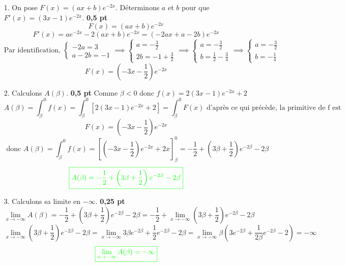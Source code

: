 \documentclass[12pt]{article}
\begin{document}
\begin{itemize}
    \item[1.] On pose $F(x) = (ax + b)e^{-2x}$. Déterminons $a$ et $b$ pour que $F'(x) = (3x - 1)e^{-2x}$. \textbf{0,5 pt}
    \[F(x) = (ax + b)e^{-2x}\]
    \[F'(x) = ae^{-2x}-2(ax + b)e^{-2x}=(-2ax+a - 2b)e^{-2x}\]
    \[
    \text{Par identification, }
    \begin{cases}
    -2a = 3\\
    a - 2b = -1
    \end{cases}
    \implies
    \begin{cases}
    a = -\frac{3}{2}\\
    2b = -1+\frac{3}{2}
    \end{cases}
    \implies
    \begin{cases}
    a = -\frac{3}{2}\\
    b = \frac{1}{2}-\frac{3}{4}
    \end{cases}
    \implies
    \begin{cases}
    a = -\frac{3}{2}\\
    b = -\frac{1}{4}
    \end{cases}
    \]
    \[F(x) =\left( -3x - \frac{1}{2}\right) e^{-2x}\]
    \item[2.] Calculons $A(\beta)$. \textbf{0,5 pt}
    Comme $\beta < 0$ donc $f(x)=2(3x - 1)e^{-2x} + 2$
    \[A(\beta)=\int_{\beta}^{0}f(x)=\int_{\beta}^{0}\left[ 2(3x - 1)e^{-2x} + 2\right]=\int_{\beta}^{0}F(x) \text{ d'après ce qui précède, la primitive de f est }\]
    \[F(x) = \left( -3x - \frac{1}{2}\right) e^{-2x} \]
    \[\text{ donc }A(\beta)=\int_{\beta}^{0}f(x)=\left[ \left( -3x - \frac{1}{2}\right) e^{-2x} + 2x\right]_{\beta}^{0}=-\frac{1}{2}+\left( 3\beta + \frac{1}{2}\right) e^{-2\beta} - 2\beta\]
     \[\textcolor{green}{\boxed{A(\beta)=-\frac{1}{2}+\left( 3\beta + \frac{1}{2}\right) e^{-2\beta} - 2\beta}}\]
    \item[3.] Calculons sa limite en $-\infty$. \textbf{0,25 pt}
    \[\lim_{x \to -\infty}A(\beta)=-\frac{1}{2}+\left( 3\beta + \frac{1}{2}\right) e^{-2\beta} - 2\beta=-\frac{1}{2}+\lim_{x \to -\infty}\left( 3\beta + \frac{1}{2}\right) e^{-2\beta} - 2\beta\]
    \[\lim_{x \to -\infty}\left( 3\beta + \frac{1}{2}\right) e^{-2\beta} - 2\beta=\lim_{x \to -\infty}3\beta e^{-2\beta} + \frac{1}{2}e^{-2\beta}  - 2\beta=\lim_{x \to -\infty}\beta\left( 3e^{-2\beta} + \frac{1}{2\beta}e^{-2\beta}  - 2\right)=-\infty\]
         \[\textcolor{green}{\boxed{\lim_{x \to -\infty}A(\beta)=-\infty}}\]
\end{itemize}
\end{document}
